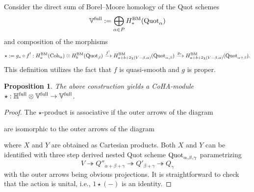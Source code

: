 \documentclass[10pt]{amsart}
\newcommand{\BH}{\mathbb{H}}
\newcommand{\BV}{\mathbb{V}}
\newcommand{\Quot}{\textnormal{Quot}}
\newcommand{\Coh}{\textnormal{Coh}}
\newcommand{\BM}{\textnormal{BM}}
\newcommand{\+}{{}^+}
\newcommand{\full}{\textnormal{full}}
\newtheorem {proposition}[theorem]{Proposition}
\theoremstyle{definition}
\theoremstyle {definition}
\theoremstyle {definition}
\begin{document}
Consider the direct sum of Borel--Moore homology of the Quot schemes 
$$\BV^\full:=\bigoplus_{\alpha\in P}H^\BM_*(\Quot_\alpha)
$$
and composition of the morphisms
$$\star:=g_*\circ f^!:H^\BM_a(\Coh_\alpha)\otimes H^\BM_b(\Quot_\beta)\xrightarrow{f^!}H^\BM_{a+b+2\chi(V-\beta,\alpha)}(\Quot_{\alpha,\beta})\xrightarrow{g_*} H^\BM_{a+b+2\chi(V-\beta,\alpha)}(\Quot_{\alpha+\beta}). 
$$
This definition utilizes the fact that $f$ is quasi-smooth and $g$ is proper. 

\begin{proposition}\label{prop: CoHA-module}
    The above construction yields a CoHA-module $\star:\BH^\full\otimes \BV^\full\rightarrow \BV^\full$. 
\end{proposition}
\begin{proof}  The $\star$-product is associative if the outer arrows of the diagram 
\begin{center}
\end{center}
are isomorphic to the outer arrows of the diagram 
\begin{center}
\end{center}
where $X$ and $Y$ are obtained as Cartesian products. Both $X$ and $Y$ can be identified with three step derived nested Quot scheme $\Quot_{\alpha,\beta,\gamma}$ parametrizing
$$V\twoheadrightarrow Q''_{\alpha+\beta+\gamma}\twoheadrightarrow Q'_{\beta+\gamma}\twoheadrightarrow Q_\gamma
$$
with the outer arrows being obvious projections. It is straightforward to check that the action is unital, i.e., $1\star(-)$ is an identity.
\end{proof}
\end{document}
